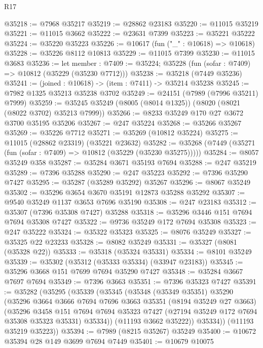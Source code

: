\begin{lexlean}{R17}
\begin{coremodule}
@35218 := @7968 @35217
@35219 := @28862 @23183
@35220 := @11015 @35219
@35221 := @11015 @3662
@35222 := @23631 @7399
@35223 := @35221 @35222
@35224 := @35220 @35223
@35226 := @10617 (fun ("_" : @10618) => @10618)
@35228 := @35226 @8112 @10813
@35229 := @11015 @7399
@35230 := @11015 @3683
@35236 := let member : @7409 := @35224;
  @35228 (fun (sofar : @7409) => @10812 (@35229 (@35230 @7712)))
@35238 := @35218 (@7449 @35236)
@35241 := (joined : @10618) -> (item : @7411) -> @35214 @35238
@35245 := @7982 @1325 @35213 @35238 @3702
@35249 := @24151 (@7989 (@7996 @35211) @7999)
@35259 := @35245 @35249 (@8005 (@8014 @1325)) (@8020 (@8021 (@8022 @3702) @35213 @7999))
@35266 := @8233 @35249 @170 @27 @3672 @3700 @35195 @35206
@35267 := @247 @35224
@35268 := @35266 @35267
@35269 := @35226 @7712
@35271 := @35269 (@10812 @35224)
@35275 := @11015 (@28862 @23319) (@35221 @23632)
@35282 := @35268 (@7449 (@35271 (fun (sofar : @7409) => @10812 (@35229 (@35230 @35275)))))
@35284 := @8057 @35249 @358
@35287 := @35284 @3671 @35193 @7694
@35288 := @247 @35219
@35289 := @7396 @35288
@35290 := @247 @35223
@35292 := @7396 @35290 @7427
@35295 := @35287 (@35289 @35292) @35267
@35296 := @8067 @35249
@35302 := @35296 @3654 @3670 @35191 @12873 @35288 @35292
@35307 := @9540 @35249 @1137 @3653 @7696 @35190
@35308 := @247 @23183
@35312 := @35307 (@7396 @35308 @7427) @35288
@35318 := @35296 @3446 @151 @7694 @7694 @35308 @7427
@35322 := @9736 @35249 @172 @7694 @35308
@35323 := @247 @35222
@35324 := @35322 @35323
@35325 := @8076 @35249
@35327 := @35325 @22 @23233
@35328 := @8082 @35249
@35331 := @35327 (@8081 (@35328 @22))
@35333 := @35318 (@35324 @35331)
@35334 := @8101 @35249
@35339 := @35302 (@35312 (@35333 @35334) (@33947 @23183))
@35345 := @35296 @3668 @151 @7699 @7694 @35290 @7427
@35348 := @35284 @3667 @7697 @7694
@35349 := @7396 @3663
@35351 := @7396 @35323 @7427
@35391 := @35282
    (@35295
      (@35339
        (@35345
          (@35348
            (@35349 @35351)
            @35290
            (@35296
              @3664
              @3666
              @7694
              @7696
              @3663
              @35351
              (@8194 @35249 @27 @3663)
              (@35296
                @3458
                @151
                @7694
                @7694
                @35323
                @7427
                (@27194 @35249 @172 @7694 @35308 @35323 @35331)
                @35334))
            (@11193 @3662 @35222))
          @35334))
      (@11193 @35219 @35223))
@35394 := @7989 (@8215 @35267) @35249
@35400 := @10672 @35394 @28 @149 @3699 @7694 @7449
@35401 := @10679 @10075

\end{coremodule}
\end{lexlean}
